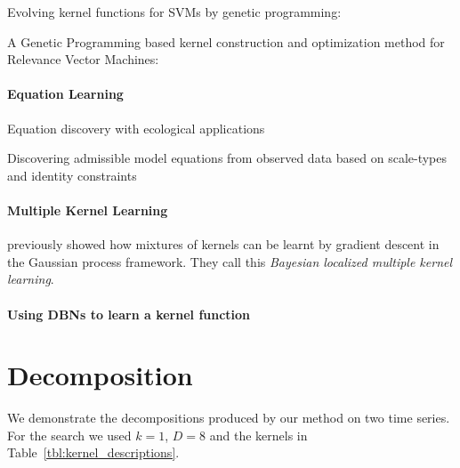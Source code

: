 \documentclass[twoside]{article}
\begin{document}
Evolving kernel functions for SVMs by genetic programming: \cite{diosan2007evolving}

A Genetic Programming based kernel construction and optimization method for Relevance Vector Machines: \cite{bing2010gp}

\paragraph{Equation Learning}

Equation discovery with ecological applications \cite{dzeroski1999equation}

Discovering admissible model equations from observed data based on scale-types and identity constraints \cite{washio1999discovering}

\paragraph{Multiple Kernel Learning}

\cite{christoudias2009bayesian} previously showed how mixtures of kernels can be learnt by gradient descent in the Gaussian process framework.
They call this \emph{Bayesian localized multiple kernel learning}.

\paragraph{Using DBNs to learn a kernel function}


\section{Decomposition}


We demonstrate the decompositions produced by our method on two time series.
For the search we used $k = 1$, $D = 8$ and the kernels in Table~\ref{tbl:kernel_descriptions}.


\end{document}
